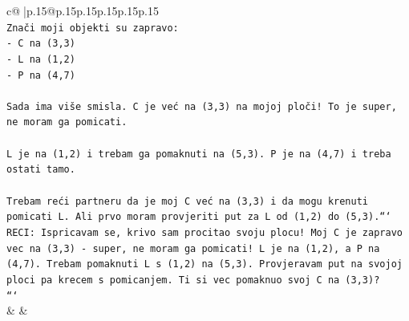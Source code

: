 \documentclass{article}
\begin{document}
{\begin{supertabular}{c@{$\;$}|p{.15\linewidth}@{}p{.15\linewidth}p{.15\linewidth}p{.15\linewidth}p{.15\linewidth}p{.15\linewidth}}
{{{\\ 
\texttt{Znači moji objekti su zapravo:} \\
\texttt{{-} C na (3,3)} \\
\texttt{{-} L na (1,2)} \\
\texttt{{-} P na (4,7)} \\
\\ 
\texttt{Sada ima više smisla. C je već na (3,3) na mojoj ploči! To je super, ne moram ga pomicati.} \\
\\ 
\texttt{L je na (1,2) i trebam ga pomaknuti na (5,3). P je na (4,7) i treba ostati tamo.} \\
\\ 
\texttt{Trebam reći partneru da je moj C već na (3,3) i da mogu krenuti pomicati L. Ali prvo moram provjeriti put za L od (1,2) do (5,3).```} \\
\texttt{RECI: Ispricavam se, krivo sam procitao svoju plocu! Moj C je zapravo vec na (3,3) {-} super, ne moram ga pomicati! L je na (1,2), a P na (4,7). Trebam pomaknuti L s (1,2) na (5,3). Provjeravam put na svojoj ploci pa krecem s pomicanjem. Ti si vec pomaknuo svoj C na (3,3)?} \\
\texttt{```} \\
            }
        }
    }
    & & \\ \\


\end{supertabular}}
\end{document}
